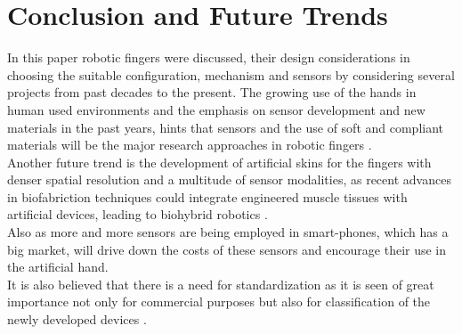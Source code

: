\documentclass[a4paper, 10pt, conference]{ieeeconf}      %
\begin{document}
\section{\textbf{Conclusion and Future Trends}}
In this paper robotic fingers were discussed, their design considerations in choosing the suitable configuration, mechanism and sensors by considering several projects from past decades to the present. The growing use of the hands in human used environments and the emphasis on sensor development and new materials in the past years, hints that sensors and the use of soft and compliant materials will be the major research approaches in robotic fingers \cite{spiers2018variable}.\\
Another future trend is the development of artificial skins for the fingers with denser spatial resolution and a multitude of sensor modalities, as recent advances in biofabriction techniques could integrate engineered muscle tissues with artificial devices, leading to biohybrid robotics \cite{feinberg2015biological} \cite{morimoto2018biohybrid}.\\
Also as more and more sensors are being employed in smart-phones, which has a big market, will drive down the costs of these sensors and encourage their use in the artificial hand.\\
It is also believed that there is a need for standardization as it is seen of great importance not only for commercial purposes but also for classification of the newly developed devices \cite{ramirez20173}.\\
\end{document}
